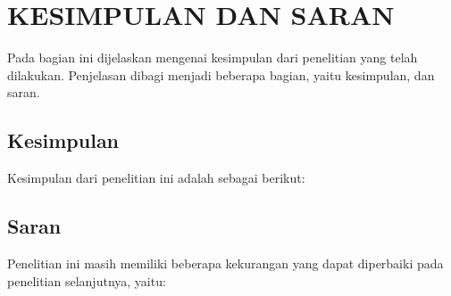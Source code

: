 \chapter{KESIMPULAN DAN SARAN}
Pada bagian ini dijelaskan mengenai kesimpulan dari penelitian yang telah dilakukan. Penjelasan dibagi menjadi beberapa bagian, yaitu kesimpulan, dan saran.

\section{Kesimpulan}
Kesimpulan dari penelitian ini adalah sebagai berikut:


\section{Saran}
Penelitian ini masih memiliki beberapa kekurangan yang dapat diperbaiki pada penelitian selanjutnya, yaitu:
